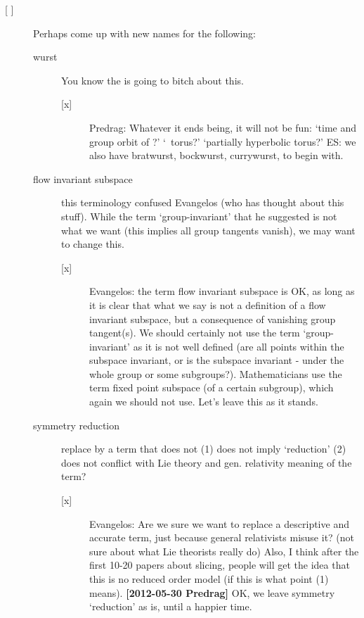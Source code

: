 \begin{description}
\begin{description}
\item[{[ ]}] Perhaps come up with new names for the following:
	\begin{description}
	\item[wurst] You know the
                  is going to bitch about this.
		\begin{description}
			\item[{[x]}] Predrag: Whatever it ends being, it will not be
                    fun: `time and group orbit of \ssp?' `\rpo\ torus?'
                    `partially hyperbolic torus?'
					{ES: we also have bratwurst, bockwurst, currywurst, to
					begin with.}
		 \end{description}
	\item[flow invariant subspace] this terminology confused Evangelos
        (who has thought about this stuff). While the term `group-invariant' that
        he suggested is not what we want (this implies all group tangents
        vanish), we may want to change this.
	  \begin{description}
	   \item[{[x]}] Evangelos: the term flow invariant subspace is OK,
	    as long as it is clear that what we say is not a definition
	    of a flow invariant subspace, but a consequence of vanishing group
	    tangent(s). We should certainly not use the term `group-invariant'
	    as it is not well defined (are all points within the subspace
	    invariant, or is the subspace invariant - under the whole group or
	    some subgroups?). Mathematicians use the term
	    fixed point subspace (of a certain subgroup), which again we should
	    not use. Let's leave this as it stands.
	   \end{description}
	\item[symmetry reduction] replace by a term that does not (1) does not imply `reduction' (2) does not conflict with Lie theory and gen. relativity meaning of the term?
	  \begin{description}
	   \item[{[x]}] Evangelos: Are we sure we want to replace
	    a descriptive and accurate term, just because general relativists
	    misuse it? (not sure about what Lie theorists really do)
	    Also, I think after the first 10-20 papers about slicing, people
	    will get the idea that this is no reduced order model (if this
	    is what point (1) means).
        {\bf [2012-05-30 Predrag]} OK, we leave symmetry  `reduction' as is, until a happier time.
	  \end{description}
	\end{description}
	

\end{description}
\end{description}
